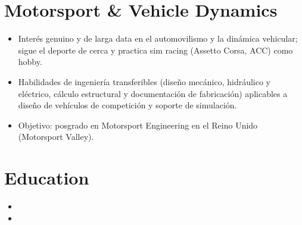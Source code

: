 \documentclass[11pt,a4paper,sans]{moderncv}
\begin{document}

\section{Motorsport \& Vehicle Dynamics}
\vspace{1pt}
\begin{itemize}
\item Interés genuino y de larga data en el automovilismo y la dinámica vehicular; sigue el deporte de cerca y practica sim racing (Assetto Corsa, ACC) como hobby.
\item Habilidades de ingeniería transferibles (diseño mecánico, hidráulico y eléctrico, cálculo estructural y documentación de fabricación) aplicables a diseño de vehículos de competición y soporte de simulación.
\item Objetivo: posgrado en Motorsport Engineering en el Reino Unido (Motorsport Valley).
\end{itemize}


\section{Education}
\vspace{1pt}
\begin{itemize}

\item{}

\vspace{3pt}

\item{}

\end{itemize}
\end{document}
